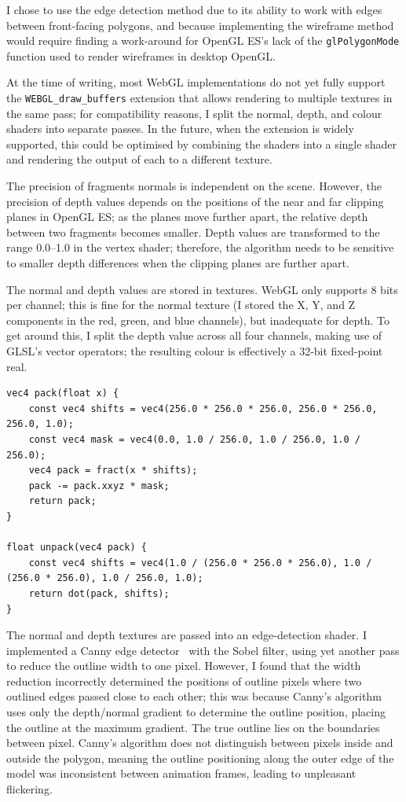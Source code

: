 \documentclass[12pt,twoside,notitlepage]{report}
\begin{document}
I chose to use the edge detection method due to its ability to work with edges between front-facing polygons, and because implementing the wireframe method would require finding a work-around for OpenGL ES's lack of the \verb|glPolygonMode| function used to render wireframes in desktop OpenGL.

At the time of writing, most WebGL implementations do not yet fully support the \verb|WEBGL_draw_buffers| extension that allows rendering to multiple textures in the same pass; for compatibility reasons, I split the normal, depth, and colour shaders into separate passes. In the future, when the extension is widely supported, this could be optimised by combining the shaders into a single shader and rendering the output of each to a different texture.

The precision of fragments normals is independent on the scene. However, the precision of depth values depends on the positions of the near and far clipping planes in OpenGL ES; as the planes move further apart, the relative depth between two fragments becomes smaller. Depth values are transformed to the range 0.0--1.0 in the vertex shader; therefore, the algorithm needs to be sensitive to smaller depth differences when the clipping planes are further apart.

The normal and depth values are stored in textures. WebGL only supports 8 bits per channel; this is fine for the normal texture (I stored the X, Y, and Z components in the red, green, and blue channels), but inadequate for depth. To get around this, I split the depth value across all four channels, making use of GLSL's vector operators; the resulting colour is effectively a 32-bit fixed-point real.

\begin{lstlisting}[caption = Packing and unpacking floating-point numbers]
vec4 pack(float x) {
	const vec4 shifts = vec4(256.0 * 256.0 * 256.0, 256.0 * 256.0, 256.0, 1.0);
	const vec4 mask = vec4(0.0, 1.0 / 256.0, 1.0 / 256.0, 1.0 / 256.0);
	vec4 pack = fract(x * shifts);
	pack -= pack.xxyz * mask;
	return pack;
}

float unpack(vec4 pack) {
	const vec4 shifts = vec4(1.0 / (256.0 * 256.0 * 256.0), 1.0 / (256.0 * 256.0), 1.0 / 256.0, 1.0);
	return dot(pack, shifts);
}
\end{lstlisting}

The normal and depth textures are passed into an edge-detection shader. I implemented a Canny edge detector~\cite{Canny:1986:CAE:11274.11275} with the Sobel filter, using yet another pass to reduce the outline width to one pixel. However, I found that the width reduction incorrectly determined the positions of outline pixels where two outlined edges passed close to each other; this was because Canny's algorithm uses only the depth/normal gradient to determine the outline position, placing the outline at the maximum gradient. The true outline lies on the boundaries between pixel. Canny's algorithm does not distinguish between pixels inside and outside the polygon, meaning the outline positioning along the outer edge of the model was inconsistent between animation frames, leading to unpleasant flickering.
\end{document}
